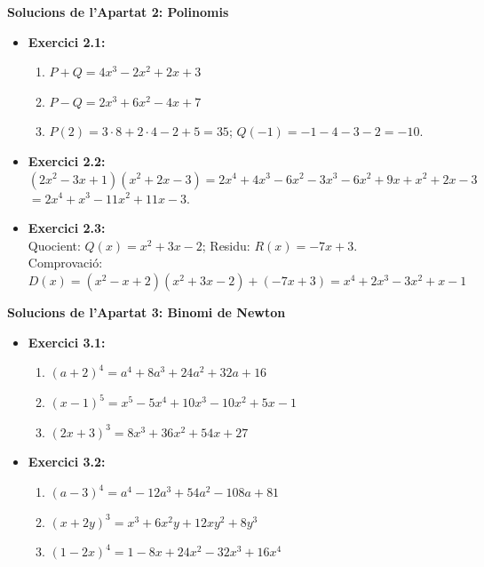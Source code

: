 \documentclass[12pt]{article}
\begin{document}
\begin{solucio}
\textbf{Solucions de l'Apartat 2: Polinomis}
\begin{itemize}
    \item \textbf{Exercici 2.1:}
    \begin{enumerate}[label=\alph*)]
        \item $P+Q = 4x^3 - 2x^2 + 2x + 3$
        \item $P-Q = 2x^3 + 6x^2 - 4x + 7$
        \item $P(2) = 3 \cdot 8 + 2 \cdot 4 - 2 + 5 = 35$; $Q(-1) = -1 - 4 - 3 - 2 = -10$.
    \end{enumerate}
    \item \textbf{Exercici 2.2:}\\
    $(2x^2-3x+1)(x^2+2x-3) = 2x^4 + 4x^3 - 6x^2 - 3x^3 - 6x^2 + 9x + x^2 + 2x - 3$ \\
    $= 2x^4 + x^3 - 11x^2 + 11x - 3$.
    \item \textbf{Exercici 2.3:}\\
    Quocient: $Q(x) = x^2 + 3x - 2$; Residu: $R(x) = -7x + 3$. \\
    Comprovació: $D(x) = (x^2-x+2)(x^2+3x-2) + (-7x+3) = x^4+2x^3-3x^2+x-1$ \checkmark
\end{itemize}
\end{solucio}

\begin{solucio}
\textbf{Solucions de l'Apartat 3: Binomi de Newton}
\begin{itemize}
    \item \textbf{Exercici 3.1:}
    \begin{enumerate}[label=\alph*)]
        \item $(a+2)^4 = a^4 + 8a^3 + 24a^2 + 32a + 16$
        \item $(x-1)^5 = x^5 - 5x^4 + 10x^3 - 10x^2 + 5x - 1$
        \item $(2x+3)^3 = 8x^3 + 36x^2 + 54x + 27$
    \end{enumerate}
    \item \textbf{Exercici 3.2:}
    \begin{enumerate}[label=\alph*)]
        \item $(a-3)^4 = a^4 - 12a^3 + 54a^2 - 108a + 81$
        \item $(x+2y)^3 = x^3 + 6x^2 y + 12xy^2 + 8y^3$
        \item $(1-2x)^4 = 1 - 8x + 24x^2 - 32x^3 + 16x^4$
    \end{enumerate}
\end{itemize}
\end{solucio}
\end{document}
